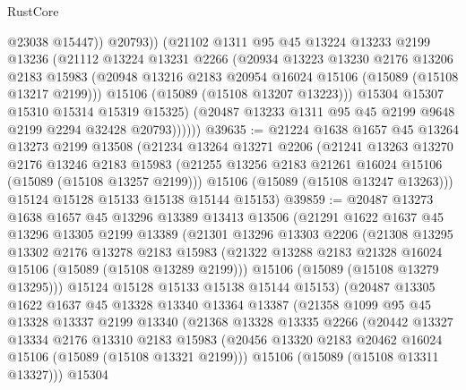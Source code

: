 \begin{lexlean}{RustCore}
\begin{coremodule}
                    @23038
                    @15447))
                @20793))
            (@21102
              @1311
              @95
              @45
              @13224
              @13233
              @2199
              @13236
              (@21112
                @13224
                @13231
                @2266
                (@20934
                  @13223
                  @13230
                  @2176
                  @13206
                  @2183
                  @15983
                  (@20948 @13216 @2183 @20954 @16024 @15106 (@15089 (@15108 @13217 @2199)))
                  @15106
                  (@15089 (@15108 @13207 @13223)))
                @15304
                @15307
                @15310
                @15314
                @15319
                @15325)
              (@20487 @13233 @1311 @95 @45 @2199 @9648 @2199 @2294 @32428 @20793))))))
@39635 := @21224
    @1638
    @1657
    @45
    @13264
    @13273
    @2199
    @13508
    (@21234
      @13264
      @13271
      @2206
      (@21241
        @13263
        @13270
        @2176
        @13246
        @2183
        @15983
        (@21255 @13256 @2183 @21261 @16024 @15106 (@15089 (@15108 @13257 @2199)))
        @15106
        (@15089 (@15108 @13247 @13263)))
      @15124
      @15128
      @15133
      @15138
      @15144
      @15153)
@39859 := @20487
    @13273
    @1638
    @1657
    @45
    @13296
    @13389
    @13413
    @13506
    (@21291
      @1622
      @1637
      @45
      @13296
      @13305
      @2199
      @13389
      (@21301
        @13296
        @13303
        @2206
        (@21308
          @13295
          @13302
          @2176
          @13278
          @2183
          @15983
          (@21322 @13288 @2183 @21328 @16024 @15106 (@15089 (@15108 @13289 @2199)))
          @15106
          (@15089 (@15108 @13279 @13295)))
        @15124
        @15128
        @15133
        @15138
        @15144
        @15153)
      (@20487
        @13305
        @1622
        @1637
        @45
        @13328
        @13340
        @13364
        @13387
        (@21358
          @1099
          @95
          @45
          @13328
          @13337
          @2199
          @13340
          (@21368
            @13328
            @13335
            @2266
            (@20442
              @13327
              @13334
              @2176
              @13310
              @2183
              @15983
              (@20456 @13320 @2183 @20462 @16024 @15106 (@15089 (@15108 @13321 @2199)))
              @15106
              (@15089 (@15108 @13311 @13327)))
            @15304

\end{coremodule}
\end{lexlean}
